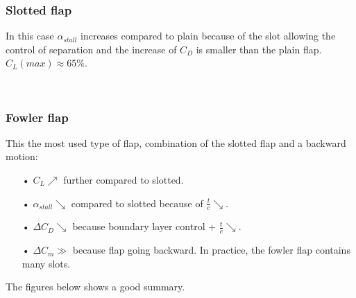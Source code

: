 \subsubsection{Slotted flap}
	In this case $\alpha _{stall}$ increases compared to plain because of the slot allowing the control of separation and the increase of $C_D$ is smaller than the plain flap. $C_L(max) \approx 65\%$.
	
	\ \\
	
\subsubsection{Fowler flap}
	This the most used type of flap, combination of the slotted flap and a backward motion: 
	
	\begin{itemize}
	\item[•] $C_L \nearrow$ further compared to slotted.  
	\item[•] $\alpha _{stall} \searrow$ compared to slotted because of $\frac{t}
{c}\searrow$.
	\item[•] $\Delta C_D \searrow$ because boundary layer control + $\frac{t}{c} \searrow$.
	\item[•] $\Delta C_m \gg$ because flap going backward. In practice, the fowler flap contains many slots. 
	\end{itemize}
	
	The figures below shows a good summary. 
	
